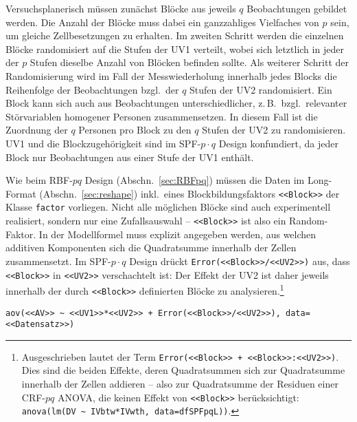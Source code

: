 Versuchsplanerisch müssen zunächst Blöcke aus jeweils $q$ Beobachtungen gebildet werden. Die Anzahl der Blöcke muss dabei ein ganzzahliges Vielfaches von $p$ sein, um gleiche Zellbesetzungen zu erhalten. Im zweiten Schritt werden die einzelnen Blöcke randomisiert auf die Stufen der UV1 verteilt, wobei sich letztlich in jeder der $p$ Stufen dieselbe Anzahl von Blöcken befinden sollte. Als weiterer Schritt der Randomisierung wird im Fall der Messwiederholung innerhalb jedes Blocks die Reihenfolge der Beobachtungen bzgl.\ der $q$ Stufen der UV2 randomisiert. Ein Block kann sich auch aus Beobachtungen unterschiedlicher, z.\,B.\ bzgl.\ relevanter Störvariablen homogener Personen zusammensetzen. In diesem Fall ist die Zuordnung der $q$ Personen pro Block zu den $q$ Stufen der UV2 zu randomisieren. UV1 und die Blockzugehörigkeit sind im SPF-$p \cdot q$ Design konfundiert, da jeder Block nur Beobachtungen aus einer Stufe der UV1 enthält.

Wie beim RBF-$pq$ Design (Abschn.\ \ref{sec:RBFpq}) müssen die Daten im Long-Format (Abschn.\ \ref{sec:reshape}) inkl.\ eines Blockbildungsfaktors \lstinline!<<Block>>! der Klasse \lstinline!factor! vorliegen. Nicht alle möglichen Blöcke sind auch experimentell realisiert, sondern nur eine Zufallsauswahl -- \lstinline!<<Block>>! ist also ein Random-Faktor. In der Modellformel muss explizit angegeben werden, aus welchen additiven Komponenten sich die Quadratsumme innerhalb der Zellen zusammensetzt. Im SPF-$p \cdot q$ Design drückt \lstinline!Error(<<Block>>/<<UV2>>)! aus, dass \lstinline!<<Block>>! in \lstinline!<<UV2>>! verschachtelt ist: Der Effekt der UV2 ist daher jeweils innerhalb der durch \lstinline!<<Block>>! definierten Blöcke zu analysieren.\footnote{Ausgeschrieben lautet der Term \lstinline!Error(<<Block>> + <<Block>>:<<UV2>>)!. Dies sind die beiden Effekte, deren Quadratsummen sich zur Quadratsumme innerhalb der Zellen addieren -- also zur Quadratsumme der Residuen einer CRF-$pq$ ANOVA, die keinen Effekt von \lstinline!<<Block>>! berücksichtigt: \lstinline!anova(lm(DV ~ IVbtw*IVwth, data=dfSPFpqL))!.}
\begin{lstlisting}
aov(<<AV>> ~ <<UV1>>*<<UV2>> + Error(<<Block>>/<<UV2>>), data=<<Datensatz>>)
\end{lstlisting}

